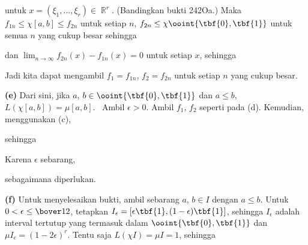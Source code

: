 {
      
      
\noindent untuk $x=(\xi_1,\ldots,\xi_r)\in\BbbR^r$. (Bandingkan bukti
242Oa.) Maka $f_{1n}\le\chi[a,b]\le f_{2n}$ untuk setiap $n$,
$f_{2n}\le\chi\ooint{\tbf{0},\tbf{1}}$ untuk semua $n$ yang cukup besar
sehingga
      
      
\noindent dan $\lim_{n\to\infty}f_{2n}(x)-f_{1n}(x)=0$ untuk setiap $x$,
sehingga
      
      
\noindent Jadi kita dapat mengambil $f_1=f_{1n}$, $f_2=f_{2n}$ untuk setiap
$n$ yang cukup besar. \Qed
      
\medskip
      
{\bf (e)} Dari sini, jika $a$, $b\in\ooint{\tbf{0},\tbf{1}}$ dan $a\le b$,
$L(\chi[a,b])=\mu[a,b]$. \Prf\ Ambil $\epsilon>0$. Ambil $f_1$, $f_2$
seperti pada (d). Kemudian, menggunakan (c),
      
      
      
\noindent sehingga
      
      
\noindent Karena $\epsilon$ sebarang,
      
      
\noindent sebagaimana diperlukan.\ \Qed
      
\medskip
      
{\bf (f)} Untuk menyelesaikan bukti, ambil sebarang $a$, $b\in I$ dengan
$a\le b$. Untuk $0<\epsilon\le\bover12$, tetapkan
$I_{\epsilon}=[\epsilon\tbf{1},(1-\epsilon)\tbf{1}]$, sehingga
$I_{\epsilon}$ adalah interval tertutup yang termasuk dalam
$\ooint{\tbf{0},\tbf{1}}$ dan $\mu I_{\epsilon}=(1-2\epsilon)^r$. Tentu saja
$L(\chi I)=\mu I=1$, sehingga
      
}
